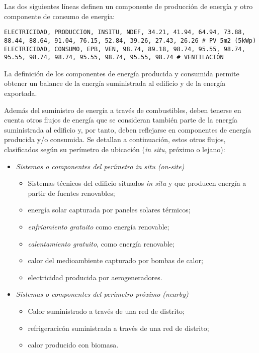 \documentclass[10pt,notitlepage,oneside,a4paper]{article}
\begin{document}
Las dos siguientes líneas definen un componente de producción de energía y otro componente de consumo de energía:

\begin{lstlisting}
ELECTRICIDAD, PRODUCCION, INSITU, NDEF, 34.21, 41.94, 64.94, 73.88, 88.44, 88.64, 91.04, 76.15, 52.84, 39.26, 27.43, 26.26 # PV 5m2 (5kWp)
ELECTRICIDAD, CONSUMO, EPB, VEN, 98.74, 89.18, 98.74, 95.55, 98.74, 95.55, 98.74, 98.74, 95.55, 98.74, 95.55, 98.74 # VENTILACIÓN
\end{lstlisting}

\begin{myquote}\small
La definición de los componentes de energía producida y consumida permite obtener un balance de la energía suministrada al edificio y de la energía exportada.

Además del suministro de energía a través de combustibles, deben tenerse en cuenta otros flujos de energía que se consideran también parte de la energía suministrada al edificio y, por tanto, deben reflejarse en componentes de energía producida y/o consumida. Se detallan a continuación, estos otros flujos, clasificados según su perímetro de ubicación (\textit{in situ}, próximo o lejano):

\begin{itemize}
\item \textit{Sistemas o componentes del perímetro \textit{in situ} (on-site)}

\begin{itemize}
\item Sistemas técnicos del edificio situados \textit{in situ} y que producen energía a partir de fuentes renovables;
\item energía solar capturada por paneles solares térmicos;
\item \textit{enfriamiento gratuito} como energía renovable;
\item \textit{calentamiento gratuito}, como energía renovable;
\item calor del medioambiente capturado por bombas de calor;
\item electricidad producida por aerogeneradores.
\end{itemize}

\item \textit{Sistemas o componentes del perímetro \textit{próximo} (nearby)}

\begin{itemize}
\item Calor suministrado a través de una red de distrito;
\item refrigeracicón suministrada a través de una red de distrito;
\item calor producido con biomasa.
\end{itemize}


\end{itemize}
\end{myquote}
\end{document}

